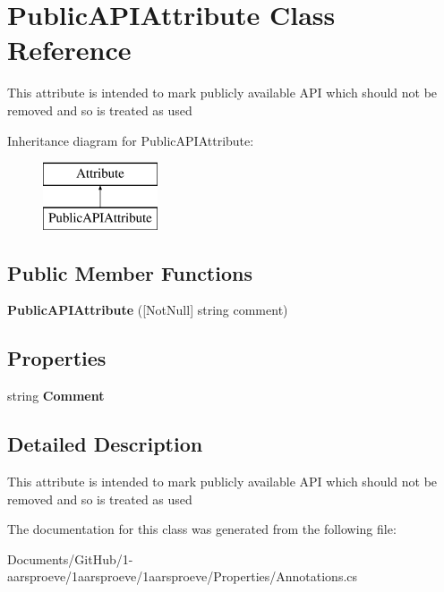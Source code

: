 \hypertarget{class_public_a_p_i_attribute}{}\section{Public\+A\+P\+I\+Attribute Class Reference}
\label{class_public_a_p_i_attribute}


This attribute is intended to mark publicly available A\+P\+I which should not be removed and so is treated as used  


Inheritance diagram for Public\+A\+P\+I\+Attribute\+:\begin{figure}[H]
\begin{center}
\leavevmode
\includegraphics[height=2.000000cm]{class_public_a_p_i_attribute}
\end{center}
\end{figure}
\subsection*{Public Member Functions}
\begin{DoxyCompactItemize}
\item 
\hypertarget{class_public_a_p_i_attribute_ab00ffb9ccf468541a8f81f85fdee678a}{}{\bfseries Public\+A\+P\+I\+Attribute} (\mbox{[}Not\+Null\mbox{]} string comment)\label{class_public_a_p_i_attribute_ab00ffb9ccf468541a8f81f85fdee678a}

\end{DoxyCompactItemize}
\subsection*{Properties}
\begin{DoxyCompactItemize}
\item 
\hypertarget{class_public_a_p_i_attribute_a4488351c8b5d0090c2bf8d69380acf6a}{}string {\bfseries Comment}\label{class_public_a_p_i_attribute_a4488351c8b5d0090c2bf8d69380acf6a}

\end{DoxyCompactItemize}


\subsection{Detailed Description}
This attribute is intended to mark publicly available A\+P\+I which should not be removed and so is treated as used 



The documentation for this class was generated from the following file\+:\begin{DoxyCompactItemize}
\item 
Documents/\+Git\+Hub/1-\/aarsproeve/1aarsproeve/1aarsproeve/\+Properties/Annotations.\+cs\end{DoxyCompactItemize}
